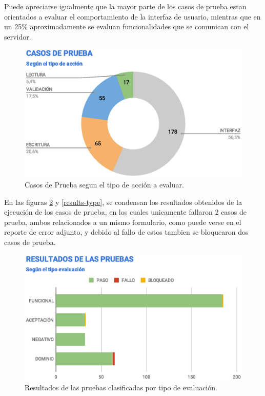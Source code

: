 Puede apreciarse igualmente que la mayor parte de los casos de prueba estan
orientados a evaluar el comportamiento de la interfaz de usuario, mientras que
en un 25\% aproximadamente se evaluan funcionalidades que se comunican con el
servidor.

\begin{figure}
\centering
\includegraphics[width=1.0\textwidth]{graphics/tc-type.eps}
\caption{Casos de Prueba segun el tipo de acción a evaluar.}
\label{tc-type}
\end{figure}

En las figuras \ref{results-tests} y \ref{results-type}, se condensan los
resultados obtenidos de la ejecución de los casos de prueba, en los cuales
unicamente fallaron 2 casos de prueba, ambos relacionados a un mismo formulario,
como puede verse en el reporte de error adjunto, y debido al fallo de estos
tambien se bloquearon dos casos de prueba.

\begin{figure}
\centering
\includegraphics[width=1.0\textwidth]{graphics/results-tests.eps}
\caption{Resultados de las pruebas clasificadas por tipo de evaluación.}
\label{results-tests}
\end{figure}

